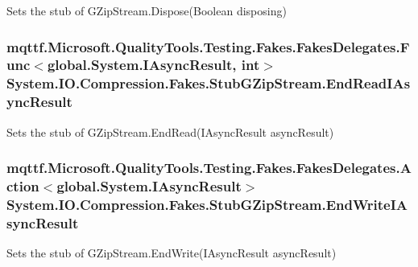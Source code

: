 Sets the stub of G\-Zip\-Stream.\-Dispose(\-Boolean disposing)

\hypertarget{class_system_1_1_i_o_1_1_compression_1_1_fakes_1_1_stub_g_zip_stream_aa0c7a95941930b09953b4ae0f4599738}{
\subsubsection[{End\-Read\-I\-Async\-Result}]{\setlength{\rightskip}{0pt plus 5cm}mqttf.\-Microsoft.\-Quality\-Tools.\-Testing.\-Fakes.\-Fakes\-Delegates.\-Func$<$global.\-System.\-I\-Async\-Result, int$>$ System.\-I\-O.\-Compression.\-Fakes.\-Stub\-G\-Zip\-Stream.\-End\-Read\-I\-Async\-Result}}\label{class_system_1_1_i_o_1_1_compression_1_1_fakes_1_1_stub_g_zip_stream_aa0c7a95941930b09953b4ae0f4599738}


Sets the stub of G\-Zip\-Stream.\-End\-Read(\-I\-Async\-Result async\-Result)

\hypertarget{class_system_1_1_i_o_1_1_compression_1_1_fakes_1_1_stub_g_zip_stream_a1eae9c44c29178c08f54492d280a6751}{
\subsubsection[{End\-Write\-I\-Async\-Result}]{\setlength{\rightskip}{0pt plus 5cm}mqttf.\-Microsoft.\-Quality\-Tools.\-Testing.\-Fakes.\-Fakes\-Delegates.\-Action$<$global.\-System.\-I\-Async\-Result$>$ System.\-I\-O.\-Compression.\-Fakes.\-Stub\-G\-Zip\-Stream.\-End\-Write\-I\-Async\-Result}}\label{class_system_1_1_i_o_1_1_compression_1_1_fakes_1_1_stub_g_zip_stream_a1eae9c44c29178c08f54492d280a6751}


Sets the stub of G\-Zip\-Stream.\-End\-Write(\-I\-Async\-Result async\-Result)


